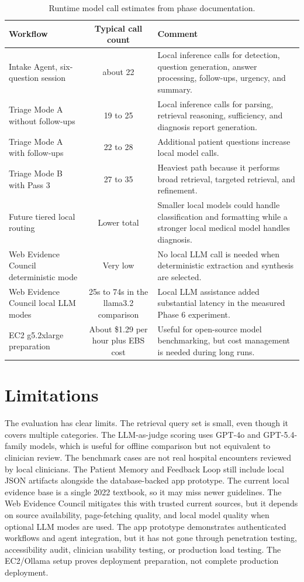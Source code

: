 \begin{table}[htbp]
\centering
\caption{Runtime model call estimates from phase documentation.}
\label{tab:llm_call_estimates}
\begin{tabular}{p{} c p{}}
\toprule
\textbf{Workflow} & \textbf{Typical call count} & \textbf{Comment}\\
\midrule
Intake Agent, six-question session & about 22 & Local inference calls for detection, question generation, answer processing, follow-ups, urgency, and summary.\\
Triage Mode A without follow-ups & 19 to 25 & Local inference calls for parsing, retrieval reasoning, sufficiency, and diagnosis report generation.\\
Triage Mode A with follow-ups & 22 to 28 & Additional patient questions increase local model calls.\\
Triage Mode B with Pass 3 & 27 to 35 & Heaviest path because it performs broad retrieval, targeted retrieval, and refinement.\\
Future tiered local routing & Lower total & Smaller local models could handle classification and formatting while a stronger local medical model handles diagnosis.\\
Web Evidence Council deterministic mode & Very low & No local LLM call is needed when deterministic extraction and synthesis are selected.\\
Web Evidence Council local LLM modes & 25s to 74s in the llama3.2 comparison & Local LLM assistance added substantial latency in the measured Phase 6 experiment.\\
EC2 g5.2xlarge preparation & About \$1.29 per hour plus EBS cost & Useful for open-source model benchmarking, but cost management is needed during long runs.\\
\bottomrule
\end{tabular}
\end{table}

\section{Limitations}

The evaluation has clear limits. The retrieval query set is small, even though it covers multiple categories. The LLM-as-judge scoring uses GPT-4o and GPT-5.4-family models, which is useful for offline comparison but not equivalent to clinician review. The benchmark cases are not real hospital encounters reviewed by local clinicians. The Patient Memory and Feedback Loop still include local JSON artifacts alongside the database-backed app prototype. The current local evidence base is a single 2022 textbook, so it may miss newer guidelines. The Web Evidence Council mitigates this with trusted current sources, but it depends on source availability, page-fetching quality, and local model quality when optional LLM modes are used. The app prototype demonstrates authenticated workflows and agent integration, but it has not gone through penetration testing, accessibility audit, clinician usability testing, or production load testing. The EC2/Ollama setup proves deployment preparation, not complete production deployment.

